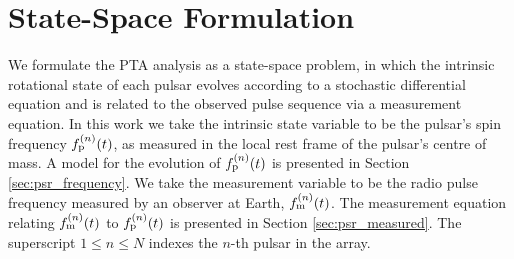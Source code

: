 \documentclass[fleqn,usenatbib,useAMS]{mnras}
\begin{document}
%
%



\section{State-Space Formulation}\label{sec:model}
We formulate the PTA analysis as a state-space problem, in which the intrinsic rotational state of each pulsar evolves according to a stochastic differential equation and is related to the observed pulse sequence via a measurement equation. In this work we take the intrinsic state variable to be the pulsar's spin frequency $f_{\rm p}^{(n)}(t)$, as measured in the local rest frame of the pulsar's centre of mass. A model for the evolution of $f_{\rm p}^{(n)}(t)$ is presented in Section \ref{sec:psr_frequency}.  We take the measurement variable to be the radio pulse frequency measured by an observer at Earth, $f_{\rm m}^{(n)}(t)$.  The measurement equation relating $f_{\rm m}^{(n)}(t)$ to $f_{\rm p}^{(n)}(t)$ is presented in Section \ref{sec:psr_measured}. The superscript $1\leq n\leq N$ indexes the $n$-th pulsar in the array.
\end{document}
